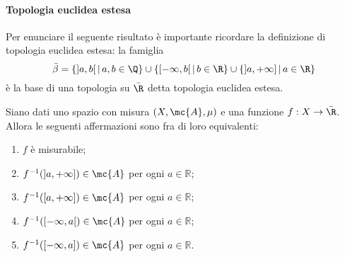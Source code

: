\paragraph*{Topologia euclidea estesa} Per enunciare il seguente risultato è importante ricordare la definizione di topologia euclidea estesa: la famiglia
\[\bar\beta = \{]a,b[\,|\,a,b\in \Q\}\cup\{[-\infty, b[\,|\, b\in \R\}\cup \{]a,+\infty]\,|\, a\in \R\}\]
è la base di una topologia su $\bar\R$ detta topologia euclidea estesa.
    
\begin{proposition}\label{prop: criterio semirette}
    Siano dati uno spazio con misura $(X, \mc{A}, \mu)$ e una funzione $f : X \rightarrow \bar \R$. Allora le seguenti affermazioni sono fra di loro equivalenti:

    \begin{enumerate}
        \item  $f$ è misurabile;
        \item $f^{-1}(]a,+\infty]) \in \mc{A}$ per ogni $a \in \mathbb{R}$;
        \item $f^{-1}([a,+\infty]) \in \mc{A}$ per ogni $a \in \mathbb{R}$;
        \item $f^{-1}([-\infty, a[) \in \mc{A}$ per ogni $a \in \mathbb{R}$;
        \item $f^{-1}([-\infty, a]) \in \mc{A}$ per ogni $a \in \mathbb{R}$.
    \end{enumerate}
\end{proposition}

